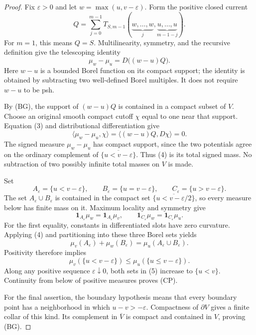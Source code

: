 \documentclass[11pt,a4paper]{article}
\numberwithin{equation}{section}
\theoremstyle{definition}
\theoremstyle{remark}
\begin{document}
\begin{proof}
Fix \(\varepsilon>0\) and let \(w=\max(u,v-\varepsilon)\). Form the
positive closed current
\[
 Q=\sum_{j=0}^{m-1}
 T_{S,m-1}(\underbrace{w,\ldots,w}_{j},
                  \underbrace{u,\ldots,u}_{m-1-j}).
\]
For \(m=1\), this means \(Q=S\). Multilinearity, symmetry, and the
recursive definition give the telescoping identity
\[
 \mu_w-\mu_u=D\bigl((w-u)Q\bigr).
\tag{3}
\]
Here \(w-u\) is a bounded Borel function on its compact support; the identity
is obtained by subtracting two well-defined Borel multiples. It does not
require \(w-u\) to be psh.

By (BG), the support of \((w-u)Q\) is contained in a compact subset of
\(V\). Choose an original smooth compact cutoff \(\chi\) equal to one
near that support. Equation (3) and distributional differentiation give
\[
 \langle\mu_w-\mu_u,\chi\rangle
 =\langle(w-u)Q,D\chi\rangle=0.
\tag{4}
\]
The signed measure \(\mu_w-\mu_u\) has compact support, since the two
potentials agree on the ordinary complement of
\(\overline{\{u<v-\varepsilon\}}\). Thus (4) is its total signed mass.
No subtraction of two possibly infinite total masses on \(V\) is made.

Set
\[
 A_\varepsilon=\{u<v-\varepsilon\},\qquad
 B_\varepsilon=\{u=v-\varepsilon\},\qquad
 C_\varepsilon=\{u>v-\varepsilon\}.
\]
The set \(A_\varepsilon\cup B_\varepsilon\) is contained in the compact
set \(\overline{\{u<v-\varepsilon/2\}}\), so every measure below has
finite mass on it. Maximum locality and symmetry give
\[
 \mathbf 1_{A_\varepsilon}\mu_w
   =\mathbf 1_{A_\varepsilon}\mu_v,
 \qquad
 \mathbf 1_{C_\varepsilon}\mu_w
   =\mathbf 1_{C_\varepsilon}\mu_u.
\]
For the first equality, constants in differentiated slots have zero
curvature. Applying (4) and partitioning into these three Borel sets yields
\[
 \mu_v(A_\varepsilon)+\mu_w(B_\varepsilon)
   =\mu_u(A_\varepsilon\cup B_\varepsilon).
\]
Positivity therefore implies
\[
 \mu_v(\{u<v-\varepsilon\})
 \leq\mu_u(\{u\leq v-\varepsilon\}).
\tag{5}
\]
Along any positive sequence \(\varepsilon\downarrow0\), both sets in
(5) increase to \(\{u<v\}\). Continuity from below of positive measures
proves (CP).

For the final assertion, the boundary hypothesis means that every boundary
point has a neighborhood in which \(u-v>-\varepsilon\). Compactness of
\(\partial V\) gives a finite collar of this kind. Its complement in
\(\overline V\) is compact and contained in \(V\), proving (BG).
\end{proof}
\end{document}
